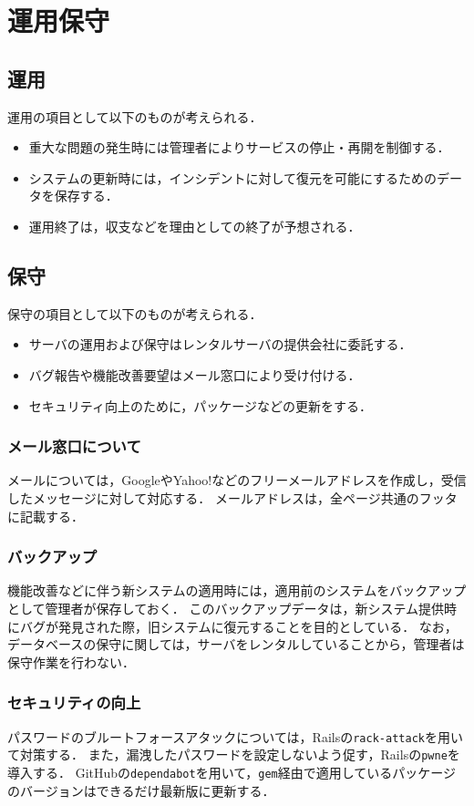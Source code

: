 \chapter{運用保守}
\section{運用}
運用の項目として以下のものが考えられる．
\begin{itemize}
    \item 重大な問題の発生時には管理者によりサービスの停止・再開を制御する．
    \item システムの更新時には，インシデントに対して復元を可能にするためのデータを保存する．
    \item 運用終了は，収支などを理由としての終了が予想される．
\end{itemize}
\section{保守}
保守の項目として以下のものが考えられる．
\begin{itemize}
    \item サーバの運用および保守はレンタルサーバの提供会社に委託する．
    \item バグ報告や機能改善要望はメール窓口により受け付ける．
    \item セキュリティ向上のために，パッケージなどの更新をする．
\end{itemize}
\subsection{メール窓口について}
メールについては，GoogleやYahoo!などのフリーメールアドレスを作成し，受信したメッセージに対して対応する．
メールアドレスは，全ページ共通のフッタに記載する．
\subsection{バックアップ}
機能改善などに伴う新システムの適用時には，適用前のシステムをバックアップとして管理者が保存しておく．
このバックアップデータは，新システム提供時にバグが発見された際，旧システムに復元することを目的としている．
なお，データベースの保守に関しては，サーバをレンタルしていることから，管理者は保守作業を行わない．
\subsection{セキュリティの向上}
パスワードのブルートフォースアタックについては，Railsの\texttt{rack-attack}を用いて対策する．
また，漏洩したパスワードを設定しないよう促す，Railsの\texttt{pwne}を導入する．
GitHubの\texttt{dependabot}を用いて，\texttt{gem}経由で適用しているパッケージのバージョンはできるだけ最新版に更新する．